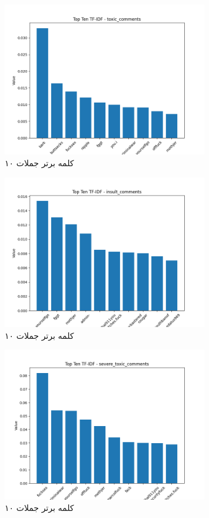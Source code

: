 \begin{figure}
  \centering
  \includegraphics[width=0.8\textwidth]{stats/top_ten_TF-IDF_toxic_comments.png}
  \caption{۱۰ کلمه برتر جملات }
  \label{fig:unique_uncommon_words_count}
\end{figure}

\begin{figure}
  \centering
  \includegraphics[width=0.8\textwidth]{stats/top_ten_TF-IDF_insult_comments.png}
  \caption{۱۰ کلمه برتر جملات }
  \label{fig:unique_common_words_total}
\end{figure}

\begin{figure}
  \centering
  \includegraphics[width=0.8\textwidth]{stats/top_ten_TF-IDF_severe_toxic_comments.png}
  \caption{۱۰ کلمه برتر جملات }
  \label{fig:unique_uncommon_words_count}
\end{figure}

